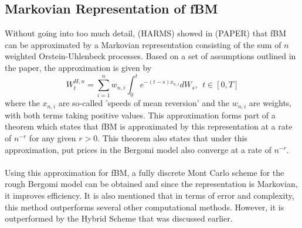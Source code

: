 \documentclass[12pt]{article}
\begin{document}
\subsection{Markovian Representation of fBM}
Without going into too much detail, ({\color{red}HARMS}) showed in ({\color{red}PAPER}) that fBM can be approximated by a Markovian representation consisting of the sum of $n$ weighted Orstein-Uhlenbeck processes.  Based on a set of assumptions outlined in the paper, the approximation is given by $$W_t^{H,n} = \sum_{i=1}^n w_{n,i} \int_0^t e^{-(t-s)x_{n,i}}dW_s, \ \ t \in [0,T]$$ where the $x_{n,i}$ are so-called 'speeds of mean reversion' and the $w_{n,i}$ are weights, with both terms taking positive values. This approximation forms part of a theorem which states that fBM is approximated by this representation at a rate of $n^{-r}$ for any given $r>0$.  This theorem also states that under this approximation, put prices in the Bergomi model also converge at a rate of $n^{-r}$. 
\\
\\
Using this approximation for fBM, a fully discrete Mont Carlo scheme for the rough Bergomi model can be obtained and since the representation is Markovian, it improves efficiency. It is also mentioned that in terms of error and complexity,  this method outperforms several other computational methods. However, it is outperformed by the Hybrid Scheme that was discussed earlier. 
\end{document}
